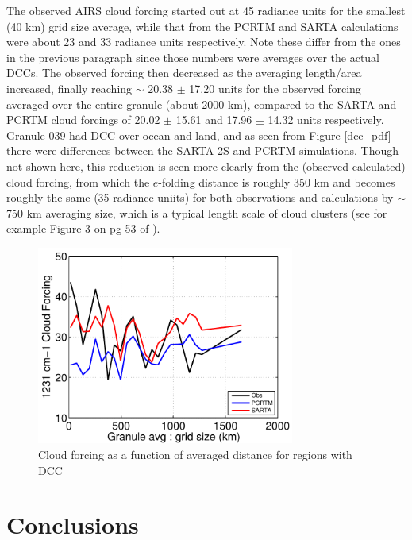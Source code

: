 \documentclass[agupp]{aguplus}              %
\begin{document}
\begin{article}
The observed AIRS cloud forcing started out at 45 radiance units for
the smallest (40 km) grid size average, while that from the PCRTM and
SARTA calculations were about 23 and 33 radiance units respectively.
Note these differ from the ones in the previous paragraph since those
numbers were averages over the actual DCCs.  The observed forcing then
decreased as the averaging length/area increased, finally reaching
$\sim$ 20.38 $\pm$ 17.20 units for the observed forcing averaged over
the entire granule (about 2000 km), compared to the SARTA and PCRTM
cloud forcings of 20.02 $\pm$ 15.61 and 17.96 $\pm$ 14.32 units
respectively.  Granule 039 had DCC over ocean and land, and as seen
from Figure \ref{dcc_pdf} there were differences between the SARTA 2S
and PCRTM simulations. Though not shown here, this reduction is seen
more clearly from the (observed-calculated) cloud forcing, from which
the $e$-folding distance is roughly 350 km and becomes roughly the same (35
radiance uniits) for both observations and calculations by $\sim$ 750
km averaging size, which is a typical length scale of cloud clusters
(see for example Figure 3 on pg 53 of \cite{vonStorch:99}).

\begin{figure}[h]
\noindent\includegraphics[width=20pc]{FIGS/ecm_cloudBT1231_gev_dcc_cloudforceVSgridsize}
\caption{Cloud forcing as a function of averaged distance for regions with DCC}
\label{dcc_cldforc}
\end{figure}

\section{Conclusions} 


\end{article}
\end{document}
